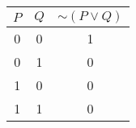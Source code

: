 \begin{tabular}{|c|c||c|}
\hline
$ P $ & $ Q $ & $  \sim (P \vee Q) $ \\
\hline
0 & 0 & 1 \\
0 & 1 & 0 \\
1 & 0 & 0 \\
1 & 1 & 0 \\
\hline
\end{tabular}
